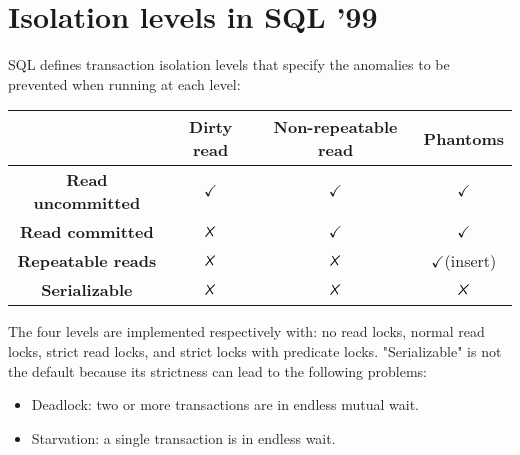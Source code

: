 \section{Isolation levels in SQL '99}

SQL defines transaction isolation levels that specify the anomalies to be prevented when running at each level:

\begin{table}[H]
    \centering      
    \begin{tabular}{c|ccc|}
    \cline{2-4}
                                                    & \textbf{Dirty read} & \textbf{Non-repeatable read} & \textbf{Phantoms}    \\ \hline
    \multicolumn{1}{|c|}{\textbf{Read uncommitted}} & $\checkmark$        & $\checkmark$                 & $\checkmark$         \\
    \multicolumn{1}{|c|}{\textbf{Read committed}}   & $\tikzxmark$        & $\checkmark$                 & $\checkmark$         \\
    \multicolumn{1}{|c|}{\textbf{Repeatable reads}}  & $\tikzxmark$        & $\tikzxmark$                 & $\checkmark$(insert) \\
    \multicolumn{1}{|c|}{\textbf{Serializable}}     & $\tikzxmark$        & $\tikzxmark$                 & $\tikzxmark$         \\ \hline
    \end{tabular}
\end{table}
The four levels are implemented respectively with: no read locks, normal read locks, strict read locks, and strict locks with predicate locks. 
"Serializable" is not the default because its strictness can lead to the following problems:
\begin{itemize}
    \item Deadlock: two or more transactions are in endless mutual wait. 
    \item Starvation: a single transaction is in endless wait. 
\end{itemize}